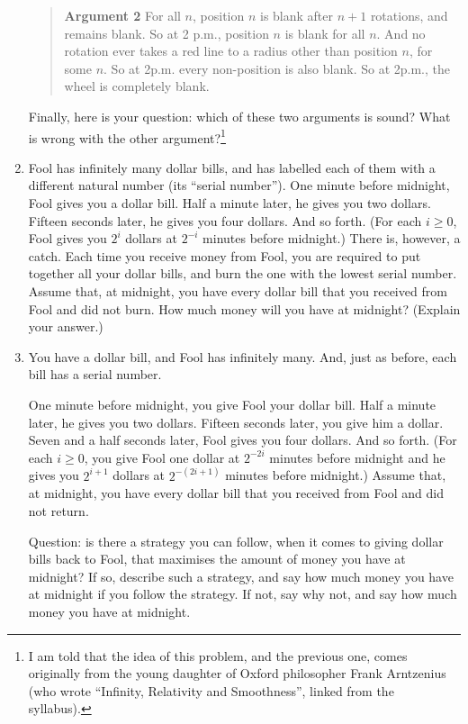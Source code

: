 \documentclass[12pt,a4paper]{article}
\begin{document}
\begin{enumerate}
\begin{quote}
\textbf{Argument 2}
For all $n$, position $n$ is blank after $n+1$ rotations, and remains blank. So at 2 p.m., position $n$ is blank for all $n$. And no rotation ever takes a red line to a radius other than position $n$, for some $n$. So at 2p.m. every non-position is also blank. So at 2p.m., the wheel is completely blank.
\end{quote}

Finally, here is your question: which of these two arguments is sound? What is wrong with the other argument?\footnote{I am told that the idea of this problem, and the previous one, comes originally from the young daughter of Oxford philosopher Frank Arntzenius (who wrote ``Infinity, Relativity and Smoothness'', linked from the syllabus).}

\item Fool has infinitely many dollar bills, and has labelled each of them with a different natural number (its ``serial number''). One minute before midnight, Fool gives you a dollar bill. Half a minute later, he gives you two dollars. Fifteen seconds later, he gives you four dollars. And so forth. (For each $i \geq 0$, Fool gives you $2^i$ dollars at $2^{-i}$ minutes before midnight.) There is, however, a catch. Each time you receive money from Fool, you are required to put together all your dollar bills, and burn the one with the lowest serial number. Assume that, at midnight, you have every dollar bill that you received from Fool and did not burn. How much money will you have at midnight? (Explain your answer.)
			
\item You have a dollar bill, and Fool has infinitely many. And, just as before, each bill has a serial number. 

One minute before midnight, you give Fool your dollar bill. Half a minute later, he gives you two dollars. Fifteen seconds later, you give him a dollar. Seven and a half seconds later, Fool gives you four dollars. And so forth. (For each $i \geq 0$, you give Fool one dollar at $2^{-2i}$ minutes before midnight and he gives you $2^{i+1}$ dollars at $2^{-(2i+1)}$ minutes before midnight.) Assume that, at midnight, you have every dollar bill that you received from Fool and did not return.

Question: is there a strategy you can follow, when it comes to giving dollar bills back to Fool, that maximises the amount of money you have at midnight? If so, describe such a strategy, and say how much money you have at midnight if you follow the strategy. If not, say why not, and say how much money you have at midnight.

\end{enumerate}
\end{document}
